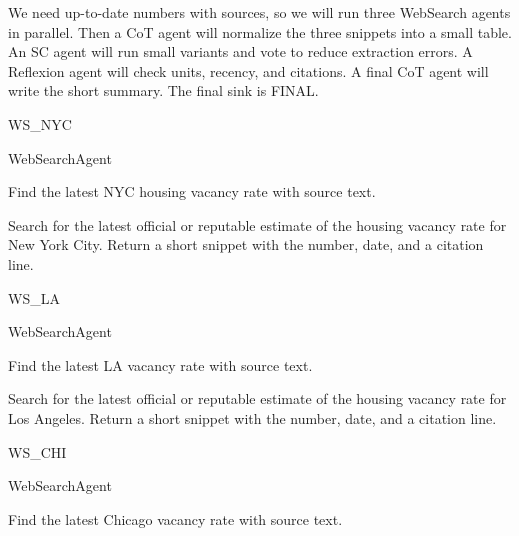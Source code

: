\begin{userprompt}[title={User Prompt}]
We need up-to-date numbers with sources, so we will run three WebSearch agents in parallel.
Then a CoT agent will normalize the three snippets into a small table.
An SC agent will run small variants and vote to reduce extraction errors.
A Reflexion agent will check units, recency, and citations.
A final CoT agent will write the short summary.
The final sink is FINAL.



\quad{}WS\_NYC

\quad{}WebSearchAgent

\quad{}
Find the latest NYC housing vacancy rate with source text.

\quad{}

\qquad{}
Search for the latest official or reputable estimate of the housing vacancy rate for New York City. Return a short snippet with the number, date, and a citation line.

\quad{}



\quad{}WS\_LA

\quad{}WebSearchAgent

\quad{}
Find the latest LA vacancy rate with source text.

\quad{}

\qquad{}
Search for the latest official or reputable estimate of the housing vacancy rate for Los Angeles. Return a short snippet with the number, date, and a citation line.

\quad{}



\quad{}WS\_CHI

\quad{}WebSearchAgent

\quad{}
Find the latest Chicago vacancy rate with source text.


\end{userprompt}
